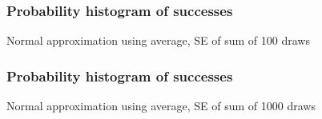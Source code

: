 \documentclass[handout]{beamer}
\begin{document}


   \begin{frame}
   \frametitle{Probability histogram of successes}
   \begin{center}
   \end{center}
   Normal approximation using average, SE of sum of 100 draws
   \end{frame}



   \begin{frame}
   \frametitle{Probability histogram of successes}
   \begin{center}
   \end{center}
   Normal approximation using average, SE of sum of 1000 draws
   \end{frame}

\end{document}
